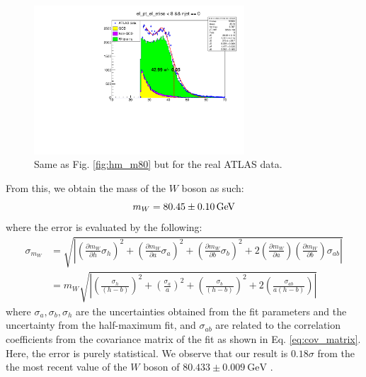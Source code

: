 \documentclass[a4paper]{report}
\numberwithin{equation}{section}
\begin{document}
\begin{figure}[htpb]
    \centering
    \includegraphics[width=0.7\textwidth]{hm_atlas.pdf}
    \caption{Same as Fig. \ref{fig:hm_m80} but for the real ATLAS data.}
    \label{fig:hm_atlas}
\end{figure}

From this, we obtain the mass of the $W$ boson as such: 
\begin{equation}
    m_W = \SI{80.45 \pm 0.10}{\giga\electronvolt} 
\end{equation}
where the error is evaluated by the following:
\begin{align}
    \sigma_{m_W} &= \sqrt{\left| \left(\frac{\partial m_W}{\partial h} \sigma_h\right)^2 
                        + \left( \frac{\partial m_W}{\partial a} \sigma_a\right)^2 
                        + \left( \frac{\partial m_W}{\partial b} \sigma_b\right)^2
                        + 2 \left( \frac{\partial m_W}{\partial a}\right) \left( \frac{\partial m_W}{\partial b}\right) \sigma_{ab} \right|} \\
            &= m_W \sqrt{\left| \left(\frac{\sigma_h}{(h - b)}\right)^2 + \left(\frac{\sigma_a}{a}\right)^2 + 
                            \left(\frac{\sigma_b}{(h - b)}\right)^2 + 2\left(\frac{\sigma_{ab}}{a(h - b)}\right) \right|} 
\end{align}
where $\sigma_a, \sigma_b, \sigma_h$ are the uncertainties obtained from the fit parameters and the uncertainty from the 
half-maximum fit, and $\sigma_{ab}$ are related to the correlation coefficients from the covariance matrix of the fit as shown in Eq. \ref{eq:cov_matrix}.
Here, the error is purely statistical. We observe that our result is $0.18\sigma$ from the 
 the most recent value of the $W$ boson of $80.433 \pm 0.009 \ \text{GeV}$ \cite{CDF:2022hxs}. \par
\end{document}
